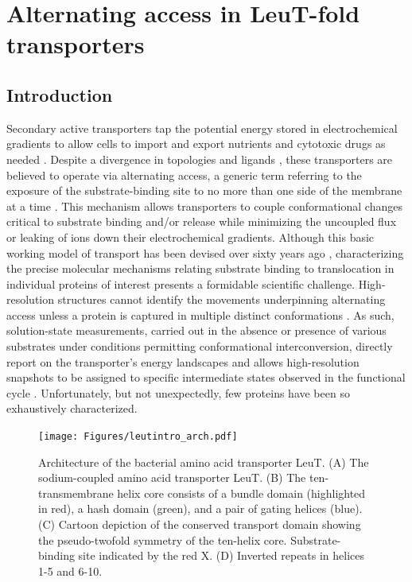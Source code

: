 \clearpage %

\chapter{Alternating access in LeuT-fold transporters}\label{ch:leutintro}

\section{Introduction}
Secondary active transporters tap the potential energy stored in electrochemical gradients to allow cells to import and export nutrients and cytotoxic drugs as needed \citep*{Bosshart2019}. Despite a divergence in topologies and ligands \citep*{Drew2016, Shi2013}, these transporters are believed to operate via alternating access, a generic term referring to the exposure of the substrate-binding site to no more than one side of the membrane at a time \citep*{Jardetzky1966, Mitchell1957}. This mechanism allows transporters to couple conformational changes critical to substrate binding and/or release while minimizing the uncoupled flux or leaking of ions down their electrochemical gradients. Although this basic working model of transport has been devised over sixty years ago \citep*{Jardetzky1966}, characterizing the precise molecular mechanisms relating substrate binding to translocation in individual proteins of interest presents a formidable scientific challenge. High-resolution structures cannot identify the movements underpinning alternating access unless a protein is captured in multiple distinct conformations \citep*{Hofmann2019, Perez2012}. As such, solution-state measurements, carried out in the absence or presence of various substrates under conditions permitting conformational interconversion, directly report on the transporter's energy landscapes and allows high-resolution snapshots to be assigned to specific intermediate states observed in the functional cycle \citep*{Juette2014, Liapakis1999, Mchaourab2011, Oganesyan2018}. Unfortunately, but not unexpectedly, few proteins have been so exhaustively characterized.

\begin{figure}[h!]
\centering
\texttt{[image: Figures/leutintro\_arch.pdf]}
 \caption[Architecture of the bacterial amino acid transporter LeuT.]{Architecture of the bacterial amino acid transporter LeuT. (A) The sodium-coupled amino acid transporter LeuT. (B) The ten-transmembrane helix core consists of a bundle domain (highlighted in red), a hash domain (green), and a pair of gating helices (blue). (C) Cartoon depiction of the conserved transport domain showing the pseudo-twofold symmetry of the ten-helix core. Substrate-binding site indicated by the red X. (D) Inverted repeats in helices 1-5 and 6-10.}
\label{fig:leutintro_arch}
\end{figure}

